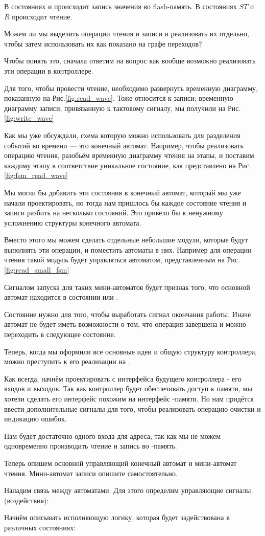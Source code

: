 \par{В состояниях  и  происходит запись значения во flash-память. В состояниях $ST$ и $R$ происходит чтение.}
\par{Можем ли мы выделить операции чтения и записи и реализовать их отдельно, чтобы затем использовать их как показано на графе переходов?}
\par{Чтобы понять это, сначала ответим на вопрос как вообще возможно реализовать эти операции в контроллере.}
\par{Для того, чтобы провести чтение, необходимо развернуть временную диаграмму, показанную на Рис.\ref{fig:read_wave}. Тоже относится к записи: временную диаграмму записи, привязанную к тактовому сигналу, мы получили на Рис. \ref{fig:write_wave}}
\par{Как мы уже обсуждали, схема которую можно использовать для разделения событий во времени --- это конечный автомат. Например, чтобы реализовать операцию чтения, разобьём временную диаграмму чтения на этапы, и поставим каждому этапу в соответствие уникальное состояние, как представлено на Рис. \ref{fig:fsm_read_wave}}
\par{Мы могли бы добавить эти состояния в конечный автомат, который мы уже начали проектировать, но тогда нам пришлось бы каждое состояние чтения и записи разбить на несколько состояний. Это привело бы к ненужному усложнению структуры конечного автомата.}
\par{Вместо этого мы можем сделать отдельные небольшие модули, которые будут выполнять эти операции, и поместить автоматы в них. Например для операции чтения такой модуль будет управляться автоматом, представленным на Рис.\ref{fig:read_small_fsm}}
\par{Сигналом запуска для таких мини-автоматов будет признак того, что основной автомат находится в состоянии  или .}
\par{Состояние  нужно для того, чтобы выработать сигнал окончания работы. Иначе  автомат не будет иметь возможности  о том, что операция завершена и можно переходить в следующее состояние.}
\par{Теперь, когда мы оформили все основные идеи и общую структуру контроллера, можно преступить к его реализации на .}
\par{Как всегда, начнём проектировать с интерфейса будущего контроллера - его входов и выходов. Так как контроллер будет обеспечивать доступ к памяти, мы хотели сделать его интерфейс похожим на интерфейс -памяти. Но нам придётся ввести дополнительные сигналы для того, чтобы реализовать операцию очистки и индикацию ошибок.}
\par{Нам будет достаточно одного входа для адреса, так как мы не можем одновременно производить чтение и запись во -память.}
\par{Теперь опишем основной управляющий конечный автомат и мини-автомат чтения. Мини-автомат записи опишите самостоятельно.}
\par{Наладим связь между автоматами. Для этого определим управляющие сигналы (воздействия):}
\par{Начнём описывать исполняющую логику, которая будет задействована в различных состояниях:}
